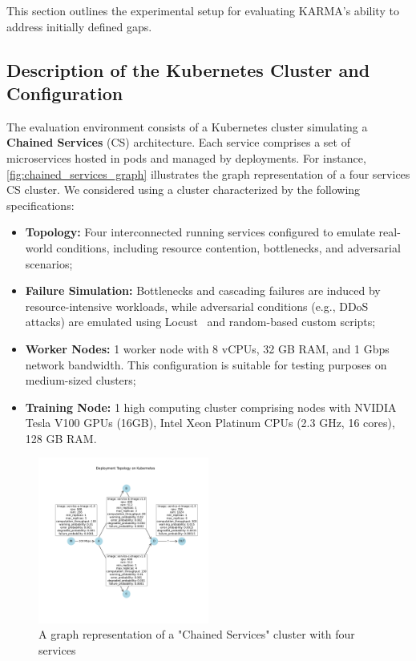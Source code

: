 \documentclass[conference]{IEEEtran}
\begin{document}
This section outlines the experimental setup for evaluating KARMA's ability to address initially defined gaps.

\subsection{Description of the Kubernetes Cluster and Configuration}

The evaluation environment consists of a Kubernetes cluster simulating a \textbf{Chained Services} (CS) architecture. Each service comprises a set of microservices hosted in pods and managed by deployments. For instance, \autoref{fig:chained_services_graph} illustrates the graph representation of a four services CS cluster. We considered using a cluster characterized by the following specifications:

\begin{itemize}
    \item \textbf{Topology:} Four interconnected running services configured to emulate real-world conditions, including resource contention, bottlenecks, and adversarial scenarios;
    \item \textbf{Failure Simulation:} Bottlenecks and cascading failures are induced by resource-intensive workloads, while adversarial conditions (e.g., DDoS attacks) are emulated using Locust~\cite{locust2021} and random-based custom scripts;
    \item \textbf{Worker Nodes:} 1 worker node with 8 vCPUs, 32 GB RAM, and 1 Gbps network bandwidth. This configuration is suitable for testing purposes on medium-sized clusters;
    \item \textbf{Training Node:} 1 high computing cluster comprising nodes with NVIDIA Tesla V100 GPUs (16GB), Intel Xeon Platinum CPUs (2.3 GHz, 16 cores), 128 GB RAM.
\end{itemize}

\begin{figure}[h!]
    \centering
    \hspace{-0.4cm}
    \includegraphics[trim=1.8cm 3.3cm 1.25cm 3.5cm, clip, width=0.5\textwidth]{figures/k8s_cluster_graph.pdf}
    \caption{A graph representation of a "Chained Services" cluster with four services}
    \label{fig:chained_services_graph}
\end{figure}
\end{document}
